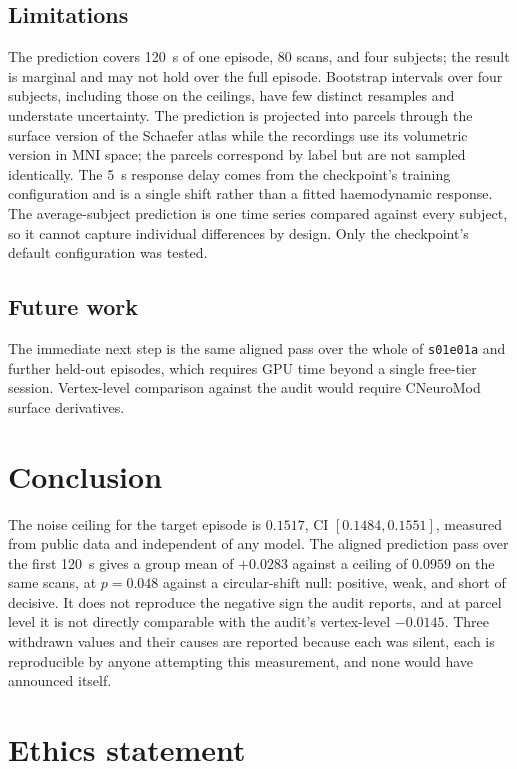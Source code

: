 \documentclass[preprint,12pt]{elsarticle}
\begin{document}
\subsection{Limitations}

The prediction covers 120~s of one episode, 80 scans, and four subjects; the result is
marginal and may not hold over the full episode. Bootstrap intervals over four subjects,
including those on the ceilings, have few distinct resamples and understate uncertainty. The
prediction is projected into parcels through the surface version of the Schaefer atlas while
the recordings use its volumetric version in MNI space; the parcels correspond by label but
are not sampled identically. The 5~s response delay comes from the checkpoint's training
configuration and is a single shift rather than a fitted haemodynamic response. The
average-subject prediction is one time series compared against every subject, so it cannot
capture individual differences by design. Only the checkpoint's default configuration was
tested.

\subsection{Future work}

The immediate next step is the same aligned pass over the whole of \texttt{s01e01a} and
further held-out episodes, which requires GPU time beyond a single free-tier session.
Vertex-level comparison against the audit would require CNeuroMod surface derivatives.

\section{Conclusion}
\label{sec:conclusion}

The noise ceiling for the target episode is $0.1517$, CI $[0.1484, 0.1551]$, measured from
public data and independent of any model. The aligned prediction pass over the first 120~s
gives a group mean of $+0.0283$ against a ceiling of $0.0959$ on the same scans, at $p = 0.048$
against a circular-shift null: positive, weak, and short of decisive. It does not reproduce the
negative sign the audit reports, and at parcel level it is not directly comparable with the
audit's vertex-level $-0.0145$. Three withdrawn values and their causes are reported because
each was silent, each is reproducible by anyone attempting this measurement, and none would
have announced itself.

\section*{Ethics statement}
\end{document}

